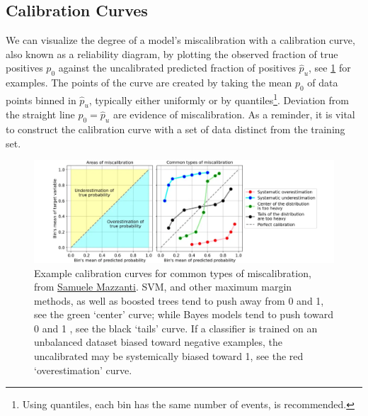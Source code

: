 \subsection{Calibration Curves}
\label{ml_general:calibration:calibration_curves}

We can visualize the degree of a model's miscalibration with a calibration curve,
also known as a reliability diagram,
by plotting the observed fraction of true positives $p_{0}$ against
the uncalibrated predicted fraction of positives $\hat{p}_{u}$,
see \cref{fig:ml_general:calibration_curves} for examples.
The points of the curve are created by taking
the mean $p_{0}$ of data points binned in $\hat{p}_{u}$,
typically either uniformly or by quantiles\footnote{Using quantiles,
\ie each bin has the same number of events, is recommended.}.
Deviation from the straight line $p_{0} = \hat{p}_{u}$ are evidence of miscalibration.
As a reminder, it is vital to construct
the calibration curve with a set of data distinct from the training set.

\begin{figure}[H]
  \centering
  \includegraphics[width=\textwidth]{figures/ml/miscalibration_illustration.png}
\caption{
Example calibration curves for common types of miscalibration,
from \href{https://towardsdatascience.com/pythons-predict-proba-doesn-t-actually-predict-probabilities-and-how-to-fix-it-f582c21d63fc}{Samuele Mazzanti}.
SVM, and other maximum margin methods, as well as boosted trees tend to push \yhat away from \num{0} and \num{1},
see the green `center' curve;
while \naive Bayes models tend to push \yhat toward \num{0} and \num{1} \cite{10.1145/1102351.1102430},
see the black `tails' curve.
If a classifier is trained on an unbalanced dataset biased toward negative examples,
the uncalibrated \yhat may be systemically biased toward \num{1},
see the red `overestimation' curve.
}
\label{fig:ml_general:calibration_curves}
\end{figure}

